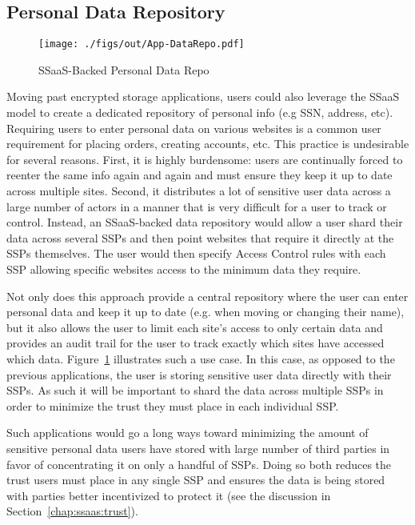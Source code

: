 \subsection{Personal Data Repository}

\begin{figure}[t]
  \centering
  \texttt{[image: ./figs/out/App-DataRepo.pdf]}
  \caption{SSaaS-Backed Personal Data Repo}
  \label{fig:apps-datarepo}
\end{figure}

Moving past encrypted storage applications, users could also leverage
the SSaaS model to create a dedicated repository of personal info (e.g
SSN, address, etc). Requiring users to enter personal data on various
websites is a common user requirement for placing orders, creating
accounts, etc. This practice is undesirable for several
reasons. First, it is highly burdensome: users are continually forced
to reenter the same info again and again and must ensure they keep it
up to date across multiple sites. Second, it distributes a lot of
sensitive user data across a large number of actors in a manner that
is very difficult for a user to track or control. Instead, an
SSaaS-backed data repository would allow a user shard their data
across several SSPs and then point websites that require it directly
at the SSPs themselves. The user would then specify Access Control
rules with each SSP allowing specific websites access to the minimum
data they require.

Not only does this approach provide a central repository where the
user can enter personal data and keep it up to date (e.g. when moving
or changing their name), but it also allows the user to limit each
site's access to only certain data and provides an audit trail for the
user to track exactly which sites have accessed which
data. Figure~\ref{fig:apps-datarepo} illustrates such a use case. In
this case, as opposed to the previous applications, the user is
storing sensitive user data directly with their SSPs. As such it will
be important to shard the data across multiple SSPs in order to
minimize the trust they must place in each individual SSP.

Such applications would go a long ways toward minimizing the amount of
sensitive personal data users have stored with large number of third
parties in favor of concentrating it on only a handful of SSPs. Doing
so both reduces the trust users must place in any single SSP and
ensures the data is being stored with parties better incentivized to
protect it (see the discussion in Section~\ref{chap:ssaas:trust}).

